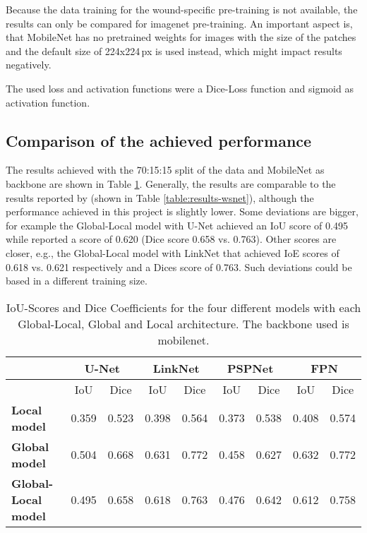 Because the data training for the wound-specific pre-training is not available, the results can only be compared for imagenet pre-training. An important aspect is, that MobileNet has no pretrained weights for images with the size of the patches and the default size of 224x224\,px is used instead, which might impact results negatively.

The used loss and activation functions were a Dice-Loss function and sigmoid as activation function.

\subsection{Comparison of the achieved performance}

The results achieved with the 70:15:15 split of the data and MobileNet as backbone are shown in Table \ref{fig:results-own}. Generally, the results are comparable to the results reported by \citeauthor{Oota_2023_WACV} (shown in Table \ref{table:results-wsnet}), although the performance achieved in this project is slightly lower. Some deviations are bigger, for example the Global-Local model with U-Net achieved an IoU score of 0.495 while \citeauthor{Oota_2023_WACV} reported a score of 0.620 (Dice score 0.658 vs. 0.763). Other scores are closer, e.g., the Global-Local model with LinkNet that achieved IoE scores of 0.618 vs. 0.621 respectively and a Dices score of 0.763. Such deviations could be based in a different training size.

\begin{table}[htb!]
	\centering
	\begin{tabular}{l||c | c | c | c | c | c | c | c|}
	& \multicolumn{2}{|c|}{U-Net} & \multicolumn{2}{|c|}{LinkNet} & \multicolumn{2}{|c|}{PSPNet} & \multicolumn{2}{|c|}{FPN} \\
	\hline
	& IoU & Dice & IoU & Dice & IoU & Dice & IoU & Dice \\
	\hline\hline
	\textbf{Local model} & 0.359 & 0.523 & 0.398 & 0.564 & 0.373 & 0.538 & 0.408 & 0.574 \\	
	\textbf{Global model} & 0.504 & 0.668 & 0.631 & 0.772 & 0.458 & 0.627 & 0.632 & 0.772 \\
	\textbf{Global-Local model} & 0.495 & 0.658 & 0.618 & 0.763 & 0.476 & 0.642 & 0.612 & 0.758\\
	\end{tabular}
	\caption{IoU-Scores and Dice Coefficients for the four different models with each Global-Local, Global and Local architecture. The backbone used is mobilenet.}
	\label{fig:results-own}
\end{table}

